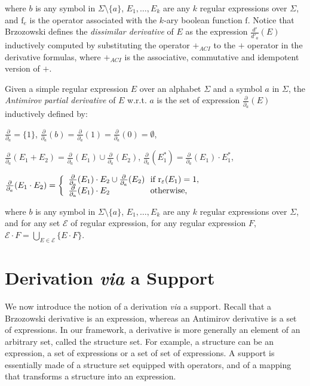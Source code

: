 \documentclass{article}
\begin{document}
  where $b$ is any symbol in $\Sigma\setminus\{a\}$, $E_1,\ldots,E_k$ are any $k$ regular expressions over $\Sigma$, and $\mathrm{f}_e$ is the operator associated with the $k$-ary boolean function $\mathrm{f}$. Notice that Brzozowski defines the \emph{dissimilar derivative} of $E$ as the expression $\frac{d'}{d'_a}(E)$ inductively computed by substituting the operator $+_{ACI}$ to the $+$ operator in the derivative formulas, where $+_{ACI}$ is the associative, commutative and idempotent version of $+$.
  
  Given a simple regular expression $E$ over an alphabet $\Sigma$ and a symbol $a$ in $\Sigma$, the \emph{Antimirov partial derivative} of $E$ w.r.t. $a$ is the set of expression $\frac{\partial}{\partial_a}(E)$ inductively defined by:

\centerline{ $\frac{\partial}{\partial_a}=\{1\}$, $\frac{\partial}{\partial_a}(b)=\frac{\partial}{\partial_a}(1)=\frac{\partial}{\partial_a}(0)=\emptyset$,}

\centerline{ $\frac{\partial}{\partial_a}(E_1+E_2)=\frac{\partial}{\partial_a}(E_1)\cup\frac{\partial}{\partial_a}(E_2)$, $\frac{\partial}{\partial_a}(E_1^*)=\frac{\partial}{\partial_a}(E_1)\cdot E_1^*$,}

\centerline{
  $\frac{\partial}{\partial_a}(E_1\cdot E_2)=
    \left\{
      \begin{array}{l@{\ }l}
        \frac{\partial}{\partial_a}(E_1)\cdot E_2 \cup \frac{\partial}{\partial_a}(E_2) & \text{ if } \mathrm{r}_\varepsilon(E_1)=1,\\
        \frac{\partial}{\partial_a}(E_1)\cdot E_2 & \text{ otherwise,}\\
      \end{array}
    \right.
  $}
  
  where $b$ is any symbol in $\Sigma\setminus\{a\}$, $E_1,\ldots,E_k$ are any $k$ regular expressions over $\Sigma$, and for any set $\mathcal{E}$ of regular expression, for any regular expression $F$, $\mathcal{E}\cdot F=\bigcup_{E\in\mathcal{E}}\{E\cdot F\}$.
  
	  
	  
\section{Derivation \emph{via} a Support}\label{sec deriv via}
We now introduce the notion of a derivation {\it via} a support.
Recall that a Brzozowski derivative is an expression, whereas an Antimirov derivative is a set of expressions.
In our 
framework,
a derivative is more generally an element of an arbitrary set, called the structure set. For example, a structure can be an expression, a set of expressions or a set of set of expressions.
A support is essentially made of a structure set equipped with operators,
and of a mapping that transforms a structure into an expression.
\end{document}
